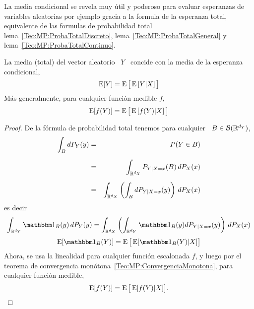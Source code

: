 La media condicional se revela muy  \'util y poderoso para evaluar esperanzas de
variables  aleatorias por ejemplo  gracia a  la formula  de la  esperanza total,
equivalente      de      las       formulas      de      probabilidad      total
lema~\ref{Teo:MP:ProbaTotalDiscreto},    lema~\ref{Teo:MP:ProbaTotalGeneral}   y
lema~\ref{Teo:MP:ProbaTotalContinuo}.
%
\begin{teorema}\label{Teo:MP:EsperanzaTotal}
%
  La media  (total) del  vector aleatorio  \ $Y$ \  concide con  la media  de la
  esperanza condicional, \ie
  \[
  \operatorname{E}[Y] = \operatorname{E}\big[ \operatorname{E}\left[ Y | X\right] \big]
  \]
  M\'as generalmente, para cualquier funci\'on medible $f$,
  \[
  \operatorname{E}[f(Y)] = \operatorname{E}\big[ \operatorname{E}\left[ f(Y) | X\right] \big]
  \]
\end{teorema}
%
\begin{proof}
  De  la  f\'ormula  de probabilidad  total  tenemos  para  cualquier \  $B  \in
  \mathcal{B}(\mathbb{R}^{d_Y})$,
  \begin{eqnarray*}
  \int_B dP_Y(y) & = & P(Y \in B)\\[2mm]
  & = & \int_{\mathbb{R}^{d_X}} P_{Y|X=x}(B) \, dP_X(x)\\[2mm]
  & = & \int_{\mathbb{R}^{d_X}} \left( \int_B dP_{Y|X=x}(y) \right) \, dP_X(x)
  \end{eqnarray*}
  es decir
  \[
  \int_{\Rset^{d_Y}}   \un_B(y)   \,   dP_Y(y)   =   \int_{\Rset^{d_X}}   \left(
    \int_{\Rset^{d_Y}} \un_B(y) dP_{Y|X=x}(y) \right) \, dP_X(x)
  \]
  \ie
  \[
  \Esp[ \un_B(Y) ] = \Esp\big[ \Esp[ \un_B(Y) | X ] \big]
  \]
  Ahora, se usa  la linealidad para cualquier funci\'on  escalonada $f$, y luego
  por  el teorema de  convergencia mon\'otona~\ref{Teo:MP:ConvergenciaMonotona},
  para cualquier funci\'on medible,
  \[
  \operatorname{E}[ f(Y) ] = \operatorname{E}\big[ \operatorname{E}[ f(Y) | X ] \big].
  \]
\end{proof}

